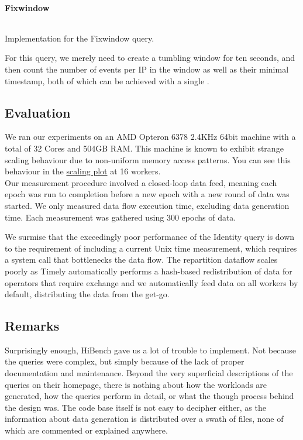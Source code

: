 \paragraph{Fixwindow}
\begin{listing}[H]
  \inputminted[firstline=205,lastline=209]{rust}{benchmarks/src/hibench.rs}
  \caption{Implementation for the Fixwindow query.}
  \label{lst:hibench-fixwindow}
\end{listing}

For this query, we merely need to create a tumbling window for ten seconds, and then count the number of events per IP in the window as well as their minimal timestamp, both of which can be achieved with a single .

\subsection{Evaluation}
We ran our experiments on an AMD Opteron 6378 2.4KHz 64bit machine with a total of 32 Cores and 504GB RAM. This machine is known to exhibit strange scaling behaviour due to non-uniform memory access patterns. You can see this behaviour in the \hyperref[figure:ysb-scaling]{scaling plot} at 16 workers. \\

Our measurement procedure involved a closed-loop data feed, meaning each epoch was run to completion before a new epoch with a new round of data was started. We only measured data flow execution time, excluding data generation time. Each measurement was gathered using 300 epochs of data. \\


We surmise that the exceedingly poor performance of the Identity query is down to the requirement of including a current Unix time measurement, which requires a system call that bottlenecks the data flow. The repartition dataflow scales poorly as Timely automatically performs a hash-based redistribution of data for operators that require exchange and we automatically feed data on all workers by default, distributing the data from the get-go.

\subsection{Remarks}\label{section:hibench-remarks}
Surprisingly enough, HiBench gave us a lot of trouble to implement. Not because the queries were complex, but simply because of the lack of proper documentation and maintenance. Beyond the very superficial descriptions of the queries on their homepage, there is nothing about how the workloads are generated, how the queries perform in detail, or what the though process behind the design was. The code base itself is not easy to decipher either, as the information about data generation is distributed over a swath of files, none of which are commented or explained anywhere. \\

